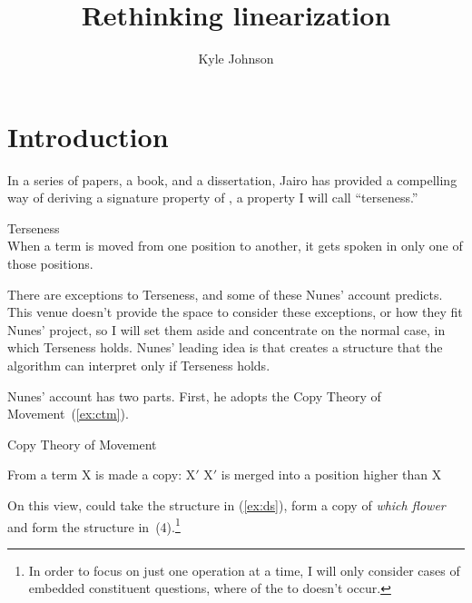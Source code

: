 \documentclass[output=paper]{langsci/langscibook}
\author{Kyle Johnson\affiliation{University of Massachusetts, Amherst}}
\title{Rethinking linearization}
\begin{document}
\glsresetall

\section{Introduction}

In a series of papers, a book, and a dissertation, Jairo \citeauthor{Nunes1995}
has provided a compelling way of deriving a signature property of , a
property I will call ``terseness.'' \nocite{Nunes1995, Nunes1996, Nunes1999}
\nocite{Nunes2004}

\begin{exe}
	\ex \label{ex:terseness} Terseness\\
    When a term is moved from one position to another, it gets spoken in only
    one of those positions.
\end{exe}

There are exceptions to Terseness, and some of these Nunes' account predicts.
This venue doesn't provide the space to consider these exceptions, or how they
fit Nunes' project, so I will set them aside and concentrate on the normal
case, in which Terseness holds. Nunes' leading idea is that  creates a
structure that the  algorithm can interpret only if Terseness
holds.

Nunes' account has two parts. First, he adopts the Copy Theory of
Movement~(\ref{ex:ctm}).
\begin{exe}
	\ex \label{ex:ctm} Copy Theory of Movement
	\begin{xlist}
		\ex From a term X is made a copy: X$'$
		\ex X$'$ is merged into a position higher than X
	\end{xlist}
\end{exe}

On this view,  could take the structure in (\ref{ex:ds}), form a
copy of \emph{which flower} and form the structure
in~(4).\footnote{In order to focus on just one  operation at a time, I
    will only consider cases of embedded constituent questions, where 
of the  to  doesn't occur.} %
\end{document}
